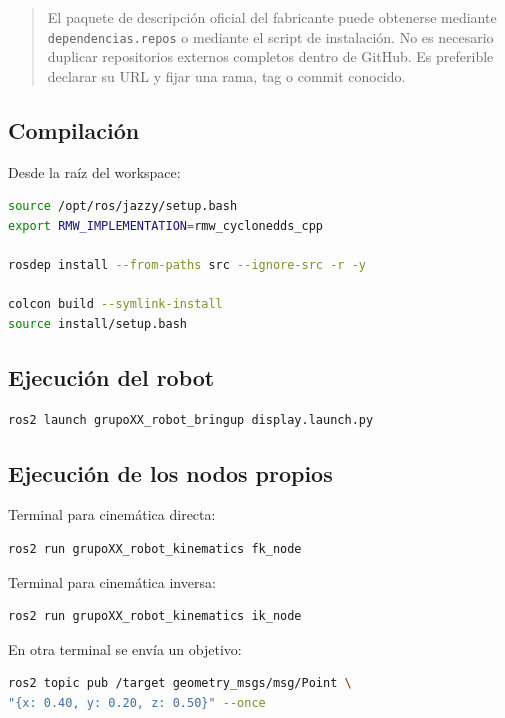 \documentclass[journal]{IEEEtran}
\newcommand{\instr}[1]{%
\begin{quote}
\small
\noindent\textbf{\color{blue}{INSTRUCCIÓN:}} #1
\end{quote}
}
\begin{document}
\instr{El paquete de descripción oficial del fabricante puede obtenerse mediante \texttt{dependencias.repos} o mediante el script de instalación. No es necesario duplicar repositorios externos completos dentro de GitHub. Es preferible declarar su URL y fijar una rama, tag o commit conocido.}

\subsection{Compilación}

Desde la raíz del workspace:

\begin{lstlisting}[language=bash]
source /opt/ros/jazzy/setup.bash
export RMW_IMPLEMENTATION=rmw_cyclonedds_cpp

rosdep install --from-paths src --ignore-src -r -y

colcon build --symlink-install
source install/setup.bash
\end{lstlisting}

\subsection{Ejecución del robot}

\begin{lstlisting}[language=bash]
ros2 launch grupoXX_robot_bringup display.launch.py
\end{lstlisting}

\subsection{Ejecución de los nodos propios}

Terminal para cinemática directa:

\begin{lstlisting}[language=bash]
ros2 run grupoXX_robot_kinematics fk_node
\end{lstlisting}

Terminal para cinemática inversa:

\begin{lstlisting}[language=bash]
ros2 run grupoXX_robot_kinematics ik_node
\end{lstlisting}

En otra terminal se envía un objetivo:

\begin{lstlisting}[language=bash]
ros2 topic pub /target geometry_msgs/msg/Point \
"{x: 0.40, y: 0.20, z: 0.50}" --once
\end{lstlisting}
\end{document}
